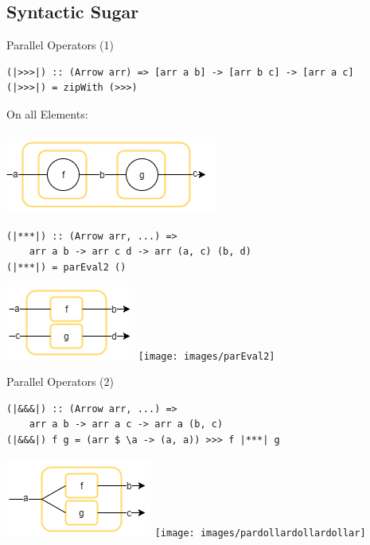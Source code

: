 \subsection{Syntactic Sugar}
\begin{frame}[fragile]{Parallel Operators (1)}
\begin{lstlisting}[frame=htrbl]
(|>>>|) :: (Arrow arr) => [arr a b] -> [arr b c] -> [arr a c]
(|>>>|) = zipWith (>>>)
\end{lstlisting}
\begin{center}
On all Elements:\\~\\
\includegraphics[scale=0.5]{images/compose}
\end{center}

\begin{lstlisting}[frame=htrbl]
(|***|) :: (Arrow arr, ...) =>
	arr a b -> arr c d -> arr (a, c) (b, d)
(|***|) = parEval2 ()
\end{lstlisting}
\begin{center}
\includegraphics[scale=0.5]{images/starstarstar}
\hspace{2em}
\texttt{[image: images/parEval2]}
\end{center}
\end{frame}

\begin{frame}[fragile]{Parallel Operators (2)}
\begin{lstlisting}[frame=htrbl]
(|&&&|) :: (Arrow arr, ...) =>
	arr a b -> arr a c -> arr a (b, c)
(|&&&|) f g = (arr $ \a -> (a, a)) >>> f |***| g
\end{lstlisting}
\begin{center}
\includegraphics[scale=0.5]{images/dollardollardollar}
\hspace{2em}
\texttt{[image: images/pardollardollardollar]}
\end{center}
\end{frame}

